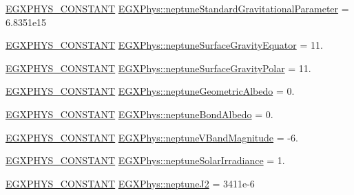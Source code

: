 \begin{DoxyCompactItemize}
\item 
\mbox{\hyperlink{group___e_g_x_phys-_constants-_macros_ga76980d288494ce1714c9ac68a95ba702}{E\+G\+X\+P\+H\+Y\+S\+\_\+\+C\+O\+N\+S\+T\+A\+NT}} \mbox{\hyperlink{group___e_g_x_phys-_constants-_astrophysics-_solar_system-_neptune-_bulk_ga7394cd8db6c84b691ab3921cafbc4923}{E\+G\+X\+Phys\+::neptune\+Standard\+Gravitational\+Parameter}} = 6.\+8351e15
\item 
\mbox{\hyperlink{group___e_g_x_phys-_constants-_macros_ga76980d288494ce1714c9ac68a95ba702}{E\+G\+X\+P\+H\+Y\+S\+\_\+\+C\+O\+N\+S\+T\+A\+NT}} \mbox{\hyperlink{group___e_g_x_phys-_constants-_astrophysics-_solar_system-_neptune-_bulk_ga16bd570f7267dfd97a2dcd7906f96056}{E\+G\+X\+Phys\+::neptune\+Surface\+Gravity\+Equator}} = 11.
\item 
\mbox{\hyperlink{group___e_g_x_phys-_constants-_macros_ga76980d288494ce1714c9ac68a95ba702}{E\+G\+X\+P\+H\+Y\+S\+\_\+\+C\+O\+N\+S\+T\+A\+NT}} \mbox{\hyperlink{group___e_g_x_phys-_constants-_astrophysics-_solar_system-_neptune-_bulk_gaced020806337cc629db19c32b936eba5}{E\+G\+X\+Phys\+::neptune\+Surface\+Gravity\+Polar}} = 11.
\item 
\mbox{\hyperlink{group___e_g_x_phys-_constants-_macros_ga76980d288494ce1714c9ac68a95ba702}{E\+G\+X\+P\+H\+Y\+S\+\_\+\+C\+O\+N\+S\+T\+A\+NT}} \mbox{\hyperlink{group___e_g_x_phys-_constants-_astrophysics-_solar_system-_neptune-_bulk_ga40aef34cd230780558c50d4bec88339d}{E\+G\+X\+Phys\+::neptune\+Geometric\+Albedo}} = 0.
\item 
\mbox{\hyperlink{group___e_g_x_phys-_constants-_macros_ga76980d288494ce1714c9ac68a95ba702}{E\+G\+X\+P\+H\+Y\+S\+\_\+\+C\+O\+N\+S\+T\+A\+NT}} \mbox{\hyperlink{group___e_g_x_phys-_constants-_astrophysics-_solar_system-_neptune-_bulk_ga137db2e1098663225fe5541e16abdac5}{E\+G\+X\+Phys\+::neptune\+Bond\+Albedo}} = 0.
\item 
\mbox{\hyperlink{group___e_g_x_phys-_constants-_macros_ga76980d288494ce1714c9ac68a95ba702}{E\+G\+X\+P\+H\+Y\+S\+\_\+\+C\+O\+N\+S\+T\+A\+NT}} \mbox{\hyperlink{group___e_g_x_phys-_constants-_astrophysics-_solar_system-_neptune-_bulk_ga6d3cc54fffb243ec0b0a4dfef481b965}{E\+G\+X\+Phys\+::neptune\+V\+Band\+Magnitude}} = -\/6.
\item 
\mbox{\hyperlink{group___e_g_x_phys-_constants-_macros_ga76980d288494ce1714c9ac68a95ba702}{E\+G\+X\+P\+H\+Y\+S\+\_\+\+C\+O\+N\+S\+T\+A\+NT}} \mbox{\hyperlink{group___e_g_x_phys-_constants-_astrophysics-_solar_system-_neptune-_bulk_ga85ea5c81fef253c61cf0be8e712ae180}{E\+G\+X\+Phys\+::neptune\+Solar\+Irradiance}} = 1.
\item 
\mbox{\hyperlink{group___e_g_x_phys-_constants-_macros_ga76980d288494ce1714c9ac68a95ba702}{E\+G\+X\+P\+H\+Y\+S\+\_\+\+C\+O\+N\+S\+T\+A\+NT}} \mbox{\hyperlink{group___e_g_x_phys-_constants-_astrophysics-_solar_system-_neptune-_bulk_gab479e5e35fc2abd4da44ac8ef8fa3f3c}{E\+G\+X\+Phys\+::neptune\+J2}} = 3411e-\/6
\end{DoxyCompactItemize}


